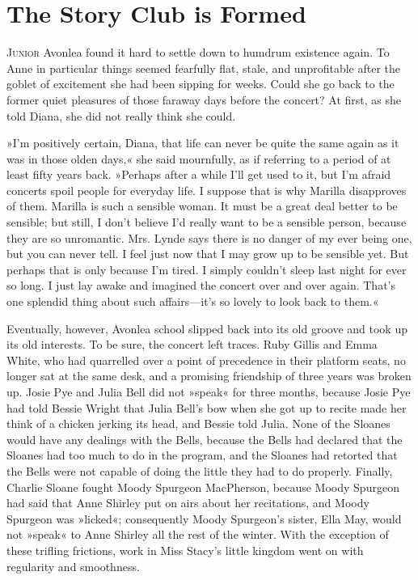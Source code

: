 \chapter{The Story Club is Formed}

\lettrine[lines=4]{J}{unior} Avonlea found it hard to settle down to humdrum existence again. To Anne in particular things seemed fearfully flat, stale, and unprofitable after the goblet of excitement she had been sipping for weeks. Could she go back to the former quiet pleasures of those faraway days before the concert? At first, as she told Diana, she did not really think she could.

»I'm positively certain, Diana, that life can never be quite the same again as it was in those olden days,« she said mournfully, as if referring to a period of at least fifty years back. »Perhaps after a while I'll get used to it, but I'm afraid concerts spoil people for everyday life. I suppose that is why Marilla disapproves of them. Marilla is such a sensible woman. It must be a great deal better to be sensible; but still, I don't believe I'd really want to be a sensible person, because they are so unromantic. Mrs. Lynde says there is no danger of my ever being one, but you can never tell. I feel just now that I may grow up to be sensible yet. But perhaps that is only because I'm tired. I simply couldn't sleep last night for ever so long. I just lay awake and imagined the concert over and over again. That's one splendid thing about such affairs—it's so lovely to look back to them.«

Eventually, however, Avonlea school slipped back into its old groove and took up its old interests. To be sure, the concert left traces. Ruby Gillis and Emma White, who had quarrelled over a point of precedence in their platform seats, no longer sat at the same desk, and a promising friendship of three years was broken up. Josie Pye and Julia Bell did not »speak« for three months, because Josie Pye had told Bessie Wright that Julia Bell's bow when she got up to recite made her think of a chicken jerking its head, and Bessie told Julia. None of the Sloanes would have any dealings with the Bells, because the Bells had declared that the Sloanes had too much to do in the program, and the Sloanes had retorted that the Bells were not capable of doing the little they had to do properly. Finally, Charlie Sloane fought Moody Spurgeon MacPherson, because Moody Spurgeon had said that Anne Shirley put on airs about her recitations, and Moody Spurgeon was »licked«; consequently Moody Spurgeon's sister, Ella May, would not »speak« to Anne Shirley all the rest of the winter. With the exception of these trifling frictions, work in Miss Stacy's little kingdom went on with regularity and smoothness.

